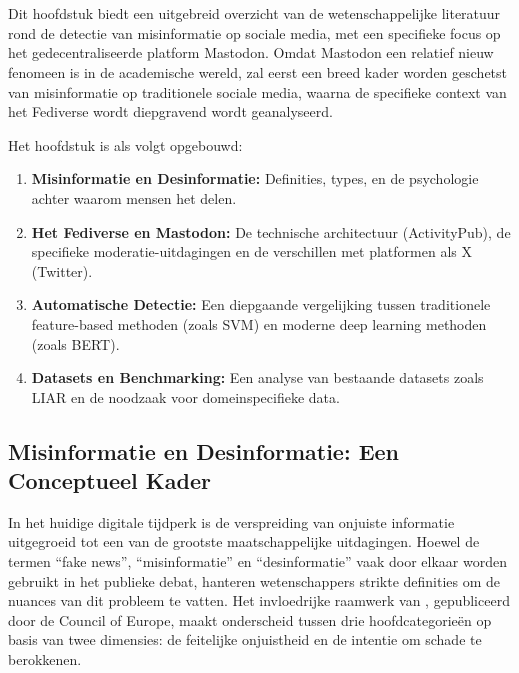 \chapter{}%
\label{ch:stand-van-zaken}



Dit hoofdstuk biedt een uitgebreid overzicht van de wetenschappelijke literatuur rond de detectie van misinformatie op sociale media, met een specifieke focus op het gedecentraliseerde platform Mastodon. Omdat Mastodon een relatief nieuw fenomeen is in de academische wereld, zal eerst een breed kader worden geschetst van misinformatie op traditionele sociale media, waarna de specifieke context van het Fediverse wordt diepgravend wordt geanalyseerd.

Het hoofdstuk is als volgt opgebouwd:
\begin{enumerate}
    \item \textbf{Misinformatie en Desinformatie:} Definities, types, en de psychologie achter waarom mensen het delen.
    \item \textbf{Het Fediverse en Mastodon:} De technische architectuur (ActivityPub), de specifieke moderatie-uitdagingen en de verschillen met platformen als X (Twitter).
    \item \textbf{Automatische Detectie:} Een diepgaande vergelijking tussen traditionele feature-based methoden (zoals SVM) en moderne deep learning methoden (zoals BERT).
    \item \textbf{Datasets en Benchmarking:} Een analyse van bestaande datasets zoals LIAR en de noodzaak voor domeinspecifieke data.
\end{enumerate}

\section{Misinformatie en Desinformatie: Een Conceptueel Kader}
\label{sec:misinformatie-definitie}

In het huidige digitale tijdperk is de verspreiding van onjuiste informatie uitgegroeid tot een van de grootste maatschappelijke uitdagingen. Hoewel de termen ``fake news'', ``misinformatie'' en ``desinformatie'' vaak door elkaar worden gebruikt in het publieke debat, hanteren wetenschappers strikte definities om de nuances van dit probleem te vatten. Het invloedrijke raamwerk van \textcite{wardle2017information}, gepubliceerd door de Council of Europe, maakt onderscheid tussen drie hoofdcategorieën op basis van twee dimensies: de feitelijke onjuistheid en de intentie om schade te berokkenen.

